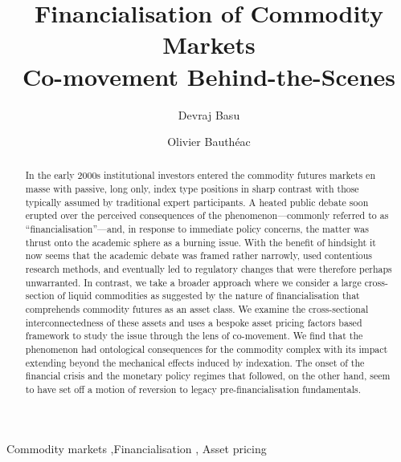 \documentclass[
  authoryear,
  preprint,
  3p]{elsarticle}
\begin{document}
\begin{frontmatter}
\title{Financialisation of Commodity Markets \\\large{Co-movement
Behind-the-Scenes} }
\author[1]{Devraj Basu%
%
}
\author[1]{Olivier Bauthéac%
%
}




        
\begin{abstract}
In the early 2000s institutional investors entered the commodity futures
markets en masse with passive, long only, index type positions in sharp
contrast with those typically assumed by traditional expert
participants. A heated public debate soon erupted over the perceived
consequences of the phenomenon---commonly referred to as
``financialisation''---and, in response to immediate policy concerns,
the matter was thrust onto the academic sphere as a burning issue. With
the benefit of hindsight it now seems that the academic debate was
framed rather narrowly, used contentious research methods, and
eventually led to regulatory changes that were therefore perhaps
unwarranted. In contrast, we take a broader approach where we consider a
large cross-section of liquid commodities as suggested by the nature of
financialisation that comprehends commodity futures as an asset class.
We examine the cross-sectional interconnectedness of these assets and
uses a bespoke asset pricing factors based framework to study the issue
through the lens of co-movement. We find that the phenomenon had
ontological consequences for the commodity complex with its impact
extending beyond the mechanical effects induced by indexation. The onset
of the financial crisis and the monetary policy regimes that followed,
on the other hand, seem to have set off a motion of reversion to legacy
pre-financialisation fundamentals.
\end{abstract}





\begin{keyword}
    Commodity markets \sep Financialisation \sep 
    Asset pricing
\end{keyword}
\end{frontmatter}
    
\end{document}
